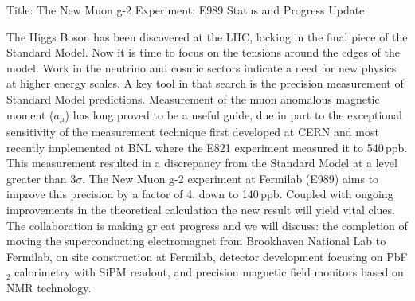 Title: The New Muon g-2 Experiment: E989 Status and Progress Update

The Higgs Boson has been discovered at the LHC, locking in the final piece of the Standard Model. Now it is time to focus on the tensions around the edges of the model. Work in the neutrino and cosmic sectors indicate a need for new physics at higher energy scales. A key tool in that search is the precision measurement of Standard Model predictions. Measurement of the muon anomalous magnetic moment ($a_{\mu}$) has long proved to be a useful guide, due in part to the exceptional sensitivity of the measurement technique first developed at CERN and most recently implemented at BNL where the E821 experiment measured it to 540$\,$ppb. This measurement resulted in a discrepancy from the Standard Model at a level greater than 3$\sigma$. The New Muon g-2 experiment at Fermilab (E989) aims to improve this precision by a factor of 4, down to 140$\,$ppb. Coupled with ongoing improvements in the theoretical calculation the new result will yield vital clues. The collaboration is making gr
 eat progress and we will discuss: the completion of moving the superconducting electromagnet from Brookhaven National Lab to Fermilab, on site construction at Fermilab, detector development focusing on PbF$_{2}$ calorimetry with SiPM readout, and precision magnetic field monitors based on NMR technology.
